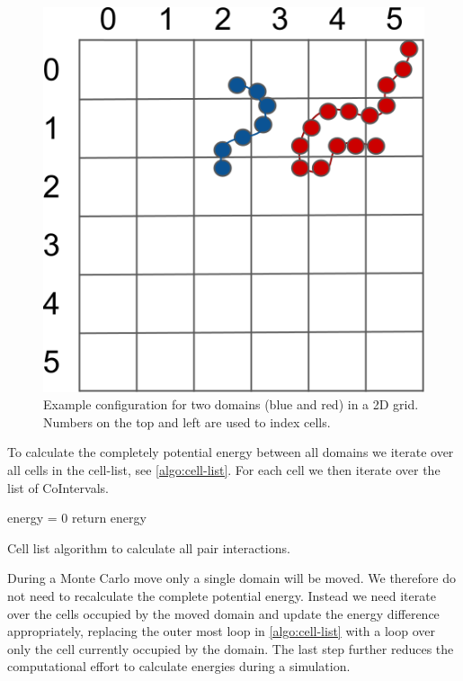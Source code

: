 \documentclass[12pt, twoside]{report}
\begin{document}
\begin{figure}[!ht] \centering
\includegraphics[]{figures/Complexesppintervals}
\caption[Cell list data-structure example.]{Example configuration for two
domains (blue and red) in a 2D grid. Numbers on the top and left are used to
index cells.}
\label{fig:celllist-datastructure}
\end{figure}

To calculate the completely potential energy between all domains we iterate over
all cells in the cell-list, see \cref{algo:cell-list}. For each cell we then
iterate over the list of CoIntervals.
\begin{algorithm2e}[h!] \SetAlgoLined \DontPrintSemicolon
   { energy = 0\;   return energy }
 \caption{Cell list algorithm to calculate all pair interactions.}
 \label{algo:cell-list}
\end{algorithm2e}
During a Monte Carlo move only a single domain will be moved.
We therefore do not need to recalculate the complete potential energy. Instead
we need iterate over the cells occupied by the moved domain and update the
energy difference appropriately, replacing the outer most loop in
\cref{algo:cell-list} with a loop over only the cell currently occupied by the
domain. The last step further reduces the computational effort to calculate
energies during a simulation.
\end{document}
